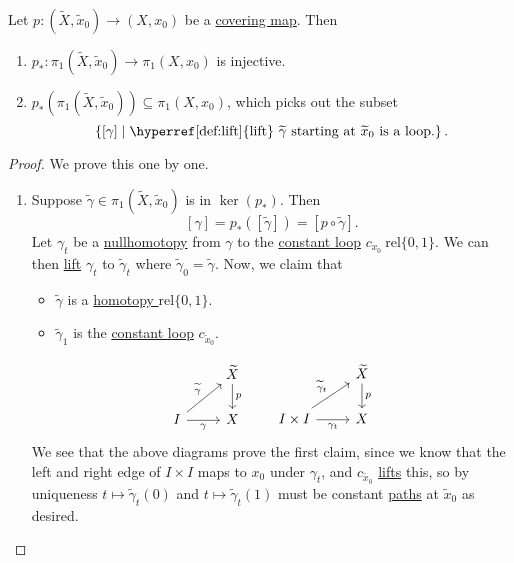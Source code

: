 \begin{proposition}
	Let \(p\colon (\widetilde{X} , \widetilde{x} _0)\to (X, x_0)\) be a \hyperref[def:covering-map]{covering map}. Then
	\begin{enumerate}[(1)]
		\item \(p_*\colon \pi _1(\widetilde{X} , \widetilde{x} _0)\to \pi _1(X, x_0)\) is injective.
		\item \(p_*(\pi _1(\widetilde{X} , \widetilde{x} _0))\subseteq \pi _1(X, x_0)\), which picks out the subset
		      \[
			      \left\{[\gamma ] \mid \text{\hyperref[def:lift]{lift} \(\widetilde{\gamma} \) starting at \(\widetilde{x} _0\) is a loop.} \right\}.
		      \]
	\end{enumerate}
\end{proposition}
\begin{proof}
	We prove this one by one.
	\begin{enumerate}[(1)]
		\item Suppose \(\widetilde{\gamma} \in \pi _1(\widetilde{X} , \widetilde{x} _0)\) is in \(\ker (p_*) \). Then
		      \[
			      [\gamma] =p_*([\widetilde{\gamma} ]) = \left[p \circ \widetilde{\gamma} \right].
		      \]
		      Let \(\gamma _{t}\) be a \hyperref[def:nullhomotopic]{nullhomotopy} from \(\gamma \) to the \hyperref[not:constant-loop]{constant loop}
		      \(c_{x_0}\ \mathrm{rel} \{0, 1\}\).
		      We can then \hyperref[def:lift]{lift} \(\gamma _{t}\) to \(\widetilde{\gamma} _{t}\) where \(\widetilde{\gamma} _0 = \widetilde{\gamma} \).
		      Now, we claim that
		      \begin{itemize}
			      \item \(\widetilde{\gamma} \) is a \hyperref[def:homotopy-relative]{homotopy \(\mathrm{rel} \{0, 1\}\)}.
			      \item \(\widetilde{\gamma} _1\) is the \hyperref[not:constant-loop]{constant loop} \(c_{\widetilde{x} _0}\).
		      \end{itemize}
		      \[
			      \begin{tikzcd}
				      & {\widetilde{X}} \\
				      I & X
				      \arrow["{\widetilde{\gamma}}", from=2-1, to=1-2]
				      \arrow["p", from=1-2, to=2-2]
				      \arrow["\gamma"', from=2-1, to=2-2]
			      \end{tikzcd}\qquad
			      \begin{tikzcd}
				      & {\widetilde{X}} \\
				      {I\times I} & X
				      \arrow["{\widetilde{\gamma}_t}", from=2-1, to=1-2]
				      \arrow["p", from=1-2, to=2-2]
				      \arrow["{\gamma_t}"', from=2-1, to=2-2]
			      \end{tikzcd}
		      \]
		      We see that the above diagrams prove the first claim, since we know that the left and right edge of \(I\times I\) maps to \(x_0\) under
		      \(\gamma _{t}\), and \(c_{\widetilde{x} _0}\) \hyperref[prop:homotopy-lifting-property]{lifts} this, so by uniqueness \(t\mapsto \widetilde{\gamma} _t(0)\) and
		      \(t\mapsto \widetilde{\gamma} _{t}(1)\) must be constant \hyperref[def:path]{paths} at \(\widetilde{x} _0\) as desired.


\end{enumerate}
\end{proof}
